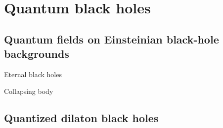 \chapter{Quantum black holes}

\section{Quantum fields on Einsteinian black-hole backgrounds}

\begin{nameddef}{Eternal black holes}

\end{nameddef}


\begin{nameddef}{Collapsing body}

\end{nameddef}


\section{Quantized dilaton black holes}